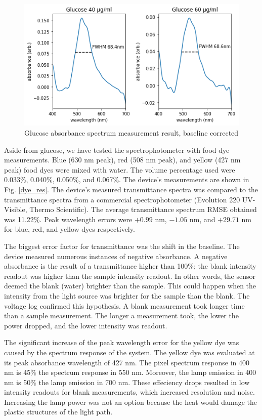 \documentclass[conference]{IEEEtran}
\begin{document}
    \begin{figure}[htbp]
    \centerline{\includegraphics[scale=0.5]{glucose-res.png}}
    \caption{Glucose absorbance spectrum measurement result, baseline corrected}
    \label{glucose_result}
    \end{figure}

Aside from glucose, we have tested the spectrophotometer with food dye measurements.
Blue (630 nm peak), red (508 nm peak), and yellow (427 nm peak) food dyes were mixed with water.
The volume percentage used were 0.033\%, 0.040\%, 0.050\%, and 0.067\%.
The device's measurements are shown in Fig. \ref{dye_res}.
The device's measured transmittance spectra was compared to the transmittance spectra from a commercial spectrophotometer (Evolution 220 UV-Visible, Thermo Scientific).
The average transmittance spectrum RMSE obtained was 11.22\%.
Peak wavelength errors were $+0.99$ nm, $-1.05$ nm, and $+29.71$ nm for blue, red, and yellow dyes respectively.

The biggest error factor for transmittance was the shift in the baseline.
The device measured numerous instances of negative absorbance.
A negative absorbance is the result of a transmittance higher than 100\%; the blank intensity readout was higher than the sample intensity readout.
In other words, the sensor deemed the blank (water) brighter than the sample.
This could happen when the intensity from the light source was brighter for the sample than the blank.
The voltage log confirmed this hypothesis.
A blank measurement took longer time than a sample measurement.
The longer a measurement took, the lower the power dropped, and the lower intensity was readout.

The significant increase of the peak wavelength error for the yellow dye was caused by the spectrum response of the system.
The yellow dye was evaluated at its peak absorbance wavelength of 427 nm.
The pixel spectrum response in 400 nm is 45\% the spectrum response in 550 nm.
Moreover, the lamp emission in 400 nm is 50\% the lamp emission in 700 nm.
These effeciency drops resulted in low intensity readouts for blank measurements, which increased resolution and noise.
Increasing the lamp power was not an option because the heat would damage the plastic structures of the light path. 
\end{document}
